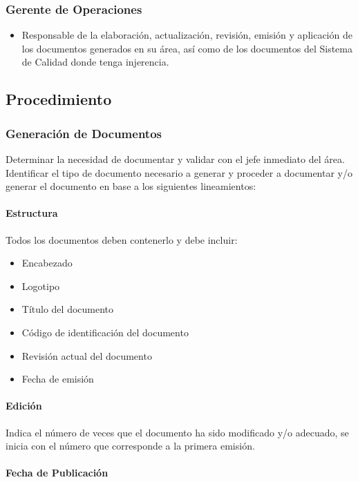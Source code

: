 \subsubsection{Gerente de Operaciones}
\begin{itemize}
	\item Responsable de la elaboración, actualización, revisión, emisión y aplicación de los documentos generados en su área, así como de los documentos del Sistema de Calidad donde tenga injerencia.
\end{itemize}

\subsection{Procedimiento}
\subsubsection{Generación de Documentos}

Determinar la necesidad de documentar y validar con el jefe inmediato del área. Identificar el tipo de documento necesario a generar y proceder a documentar y/o generar el documento en base a los siguientes lineamientos:

\paragraph{Estructura}

Todos los documentos deben contenerlo y debe incluir:

\begin{itemize}
	\item Encabezado
	\item Logotipo
	\item Título del documento
	\item Código de identificación del documento
	\item Revisión actual del documento
	\item Fecha de emisión
\end{itemize}

\paragraph{Edición}

Indica el número de veces que el documento ha sido modificado y/o adecuado, se inicia con el número que corresponde a la primera emisión.

\paragraph{Fecha de Publicación}

